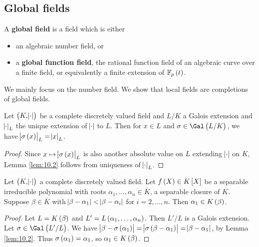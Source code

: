 \pagebreak

\subsection{Global fields}


\begin{definition}
A \textbf{global field} is a field which is either
\begin{itemize}
\item an algebraic number field, or
\item a \textbf{global function field}, the rational function field of an algebraic curve over a finite field, or equivalently a finite extension of $ \FF_p\br{t} $.
\end{itemize}
\end{definition}

We mainly focus on the number field. We show that local fields are completions of global fields.

\begin{lemma}
\label{lem:10.2}
Let $ \br{K, \abs{\cdot}} $ be a complete discretely valued field and $ L / K $ a Galois extension and $ \abs{\cdot}_L $ the unique extension of $ \abs{\cdot} $ to $ L $. Then for $ x \in L $ and $ \sigma \in \Gal\br{L / K} $, we have $ \abs{\sigma\br{x}}_L = \abs{x}_L $.
\end{lemma}

\begin{proof}
Since $ x \mapsto \abs{\sigma\br{x}}_L $ is also another absolute value on $ L $ extending $ \abs{\cdot} $ on $ K $, Lemma \ref{lem:10.2} follows from uniqueness of $ \abs{\cdot}_L $.
\end{proof}

\begin{lemma}
Let $ \br{K, \abs{\cdot}} $ a complete discretely valued field. Let $ f\br{X} \in K\sbr{X} $ be a separable irreducible polynomial with roots $ \alpha_1, \dots, \alpha_n \in \overline{K} $, a separable closure of $ K $. Suppose $ \beta \in \overline{K} $ with $ \abs{\beta - \alpha_1} < \abs{\beta - \alpha_i} $ for $ i = 2, \dots, n $. Then $ \alpha_1 \in K\br{\beta} $.
\end{lemma}

\begin{proof}
Let $ L = K\br{\beta} $ and $ L' = L\br{\alpha_1, \dots, \alpha_n} $. Then $ L' / L $ is a Galois extension. Let $ \sigma \in \Gal\br{L' / L} $. We have $ \abs{\beta - \sigma\br{\alpha_1}} = \abs{\sigma\br{\beta - \alpha_1}} = \abs{\beta - \alpha_1} $, by Lemma \ref{lem:10.2}. Thus $ \sigma\br{\alpha_1} = \alpha_1 $, so $ \alpha_1 \in K\br{\beta} $.
\end{proof}

